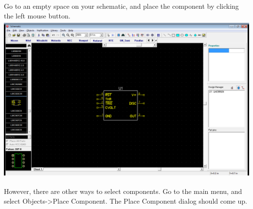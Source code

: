 \documentclass[letterpaper]{article}
\begin{document}
{\sffamily\color[rgb]{0.30980393,0.5058824,0.7411765}
Go to an empty space on your schematic, and place the component by clicking the left mouse button.\newline
 \includegraphics[width=5.4in,height=3.3665in]{figures/ee4document-img019.png} }

{\sffamily\color[rgb]{0.30980393,0.5058824,0.7411765}
However, there are other ways to select components. Go to the main menu, and select Objects-{\textgreater}Place
Component. The Place Component dialog should come up.}
\end{document}
